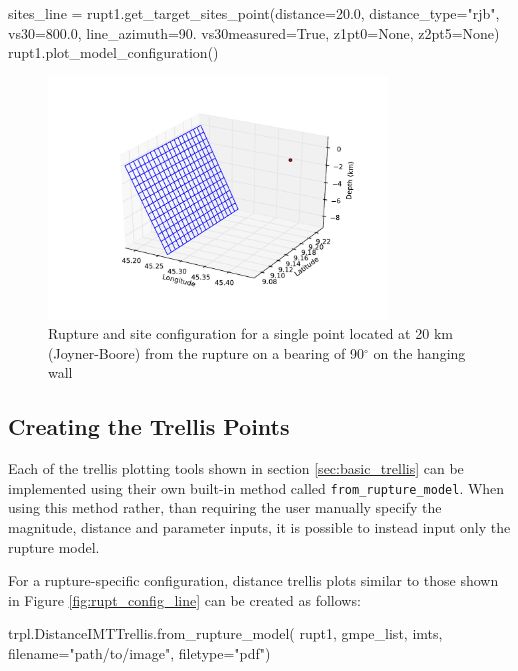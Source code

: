 \begin{python}
sites_line = rupt1.get_target_sites_point(distance=20.0,
                                          distance_type="rjb",
                                          vs30=800.0,
                                          line_azimuth=90.
                                          vs30measured=True,
                                          z1pt0=None,
                                          z2pt5=None)
rupt1.plot_model_configuration()
\end{python}

\begin{figure}[htbp]
	\centering
		\includegraphics[width=9cm]{./figures/trellis/rupt_config_site.pdf}
	\caption{Rupture and site configuration for a single point located at 20 km (Joyner-Boore) from the rupture on a bearing of 90$^{\circ}$ on the hanging wall}
	\label{fig:rupt_config_site}
\end{figure}

\subsection{Creating the Trellis Points}

Each of the trellis plotting tools shown in section \ref{sec:basic_trellis} can be implemented using their own built-in method called \verb=from_rupture_model=. When using this method rather, than requiring the user manually specify the magnitude, distance and parameter inputs, it is possible to instead input only the rupture model.

For a rupture-specific configuration, distance trellis plots similar to those shown in Figure \ref{fig:rupt_config_line} can be created as follows:

\begin{python}
trpl.DistanceIMTTrellis.from_rupture_model(
    rupt1,
    gmpe_list,
    imts, 
    filename="path/to/image",
    filetype="pdf")
\end{python}

